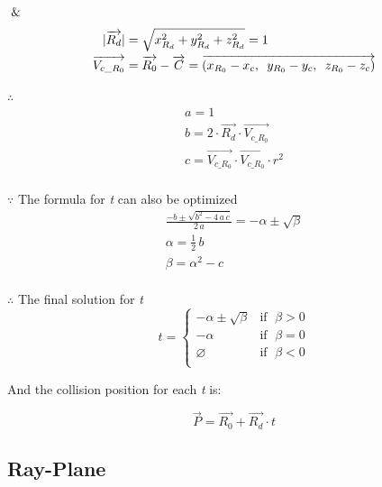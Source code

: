 $\And$
\[
\begin{array}{lr}
\begin{aligned}
\lvert \overrightarrow{R_d} \rvert &= \sqrt{x_{R_d}^2 + y_{R_d}^2 + z_{R_d}^2} = 1\\
\overrightarrow{V_{c\_R_0}} &= \overrightarrow{R_0} - \overrightarrow{C} = \overrightarrow{(x_{R_0} - x_c,\enspace y_{R_0} - y_c,\enspace z_{R_0} - z_c)}\\
\end{aligned}
\end{array}
\]

$\therefore$
\[
\begin{array}{lr}
a =1\\
b = 2 \cdot \overrightarrow{R_d} \cdot \overrightarrow{V_{c\_R_0}}\\
c = \overrightarrow{V_{c\_R_0}} \cdot \overrightarrow{V_{c\_R_0}} \cdot r^2\\
\end{array}
\]

$\because$ The formula for \emph{t} can also be optimized
\[
\begin{array}{lr}
\frac{-b \pm \sqrt{b^2 - 4\,a\,c}}{2\,a} = -\alpha \pm \sqrt{\beta}\\
\alpha = \frac{1}{2}\,b\\
\beta = \alpha^2 - c\\
\end{array}
\]

$\therefore$ The final solution for \emph{t}
\[
t =
\begin{cases}
 -\alpha \pm \sqrt{\beta} & \text{if }\;\beta > 0\\
-\alpha & \text{if }\;\beta = 0\\
\varnothing & \text{if }\;\beta < 0\\
\end{cases}
\]

And the collision position for each \emph{t} is:

\[
\overrightarrow{P} = \overrightarrow{R_0} + \overrightarrow{R_d} \cdot t
\]

\subsection{Ray-Plane}


